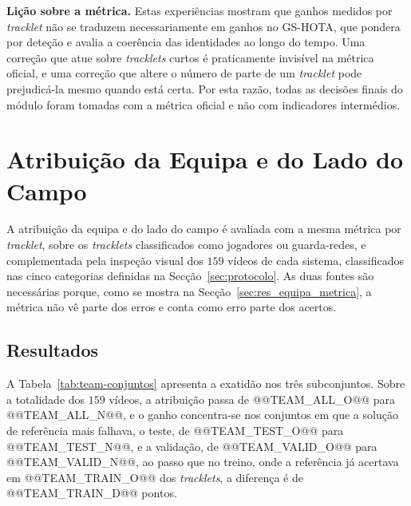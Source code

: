 \medskip\noindent\textbf{Lição sobre a métrica.} Estas experiências mostram que ganhos medidos por
\emph{tracklet} não se traduzem necessariamente em ganhos no GS-HOTA, que pondera por deteção e
avalia a coerência das identidades ao longo do tempo. Uma correção que atue sobre \emph{tracklets}
curtos é praticamente invisível na métrica oficial, e uma correção que altere o número de parte de
um \emph{tracklet} pode prejudicá-la mesmo quando está certa. Por esta razão, todas as decisões
finais do módulo foram tomadas com a métrica oficial e não com indicadores intermédios.

\section{Atribuição da Equipa e do Lado do Campo}\label{sec:res_equipa}

A atribuição da equipa e do lado do campo é avaliada com a mesma métrica por \emph{tracklet},
sobre os \emph{tracklets} classificados como jogadores ou guarda-redes, e complementada pela inspeção
visual dos $159$ vídeos de cada sistema, classificados nas cinco categorias definidas na
Secção~\ref{sec:protocolo}. As duas fontes são necessárias porque, como se mostra na
Secção~\ref{sec:res_equipa_metrica}, a métrica não vê parte dos erros e conta como erro parte dos
acertos.

\subsection{Resultados}\label{sec:res_equipa_resultados}

A Tabela~\ref{tab:team-conjuntos} apresenta a exatidão nos três subconjuntos. Sobre a totalidade
dos $159$ vídeos, a atribuição passa de @@TEAM_ALL_O@@ para @@TEAM_ALL_N@@, e o ganho concentra-se
nos conjuntos em que a solução de referência mais falhava, o teste, de @@TEAM_TEST_O@@ para
@@TEAM_TEST_N@@, e a validação, de @@TEAM_VALID_O@@ para @@TEAM_VALID_N@@, ao passo que no treino,
onde a referência já acertava em @@TEAM_TRAIN_O@@ dos \emph{tracklets}, a diferença é de
@@TEAM_TRAIN_D@@ pontos.

